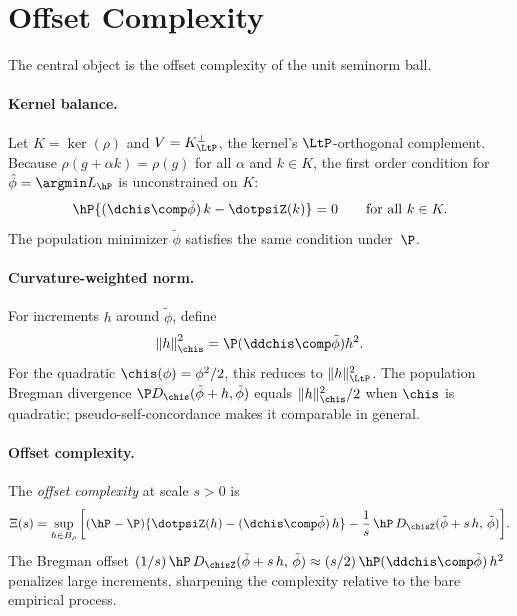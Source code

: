 \documentclass{article}
\begin{document}

\section{Offset Complexity}
\label{sec:offset-complexity}

The central object is the offset complexity
of the unit seminorm ball.

\paragraph{Kernel balance.}
Let $K = \ker(\rho)$
and $V = K^{\perp}_{\LtP}$,
the kernel's $\LtP$-orthogonal complement.
Because $\rho(g + \alpha k) = \rho(g)$
for all $\alpha$
and $k \in K$,
the first order condition
for $\hat\phi = \argmin L_{\hP}$
is unconstrained on $K$:
\begin{equation}
\label{eq:kernel-balance}
\hP\{(\dchis \comp \hat\phi)\, k - \dotpsiZ(k)\} = 0
\qquad \text{for all } k \in K.
\end{equation}
The population minimizer $\tilde\phi$
satisfies the same condition under~$\P$.

\paragraph{Curvature-weighted norm.}
For increments $h$ around $\tilde\phi$, define
\begin{equation}\label{eq:curvature-norm}
\norm{h}_{\chis}^2 = \P (\ddchis \comp \tilde\phi) h^2.
\end{equation}
For the quadratic $\chis(\phi) = \phi^2/2$,
this reduces to $\|h\|_{\LtP}^2$.
The population Bregman divergence
$\P D_{\chis}(\tilde\phi + h, \tilde\phi)$
equals $\|h\|_{\chis}^2/2$
when $\chis$ is quadratic;
pseudo-self-concordance makes it comparable
in general.

\paragraph{Offset complexity.}
The \emph{offset complexity} at scale $s > 0$ is
\begin{equation}\label{eq:offset-complexity}
\Xi(s) = \sup_{h \in B_\rho} \qty[ (\hP - \P)\{\dotpsiZ(h) - (\dchis \comp \tilde\phi)\, h\} - \frac{1}{s}\, \hP\, D_{\chisZ}(\tilde\phi + s\,h,\, \tilde\phi) ].
\end{equation}
The Bregman offset
$(1/s)\,\hP\, D_{\chisZ}(\tilde\phi + s\,h,\, \tilde\phi)
  \approx (s/2)\, \hP (\ddchis \comp \tilde\phi)\, h^2$
penalizes large increments,
sharpening the complexity
relative to the bare empirical process.
\end{document}
